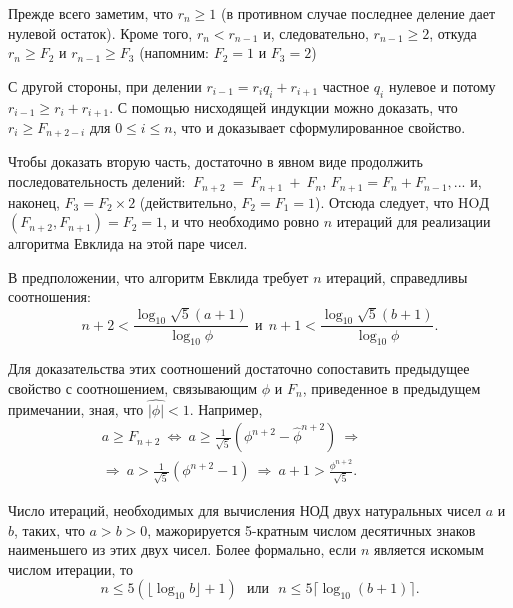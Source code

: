 \begin{myproof}
Прежде всего заметим, что $r_n \geqslant 1$ (в противном случае последнее 
деление дает нулевой остаток). Кроме того, $r_n < r_{n-1}$ и,  
следовательно, $r_{n-1} \geqslant 2$, откуда $r_n \geqslant F_2$ и $r_{n-1} \geqslant F_3$ (напомним: $F_2 = 1$ и 
$F_3 = 2$)

\noindent С другой стороны, при делении $r_{i-1} = r_i q_i + r_{i + 1}$  частное $q_i$ нулевое 
и потому $r_{i-1} \geqslant r_i + r_{i+1}$. С помощью нисходящей индукции можно 
доказать, что $r_i \geqslant F_{n+2-i}$ для $0 \leqslant i \leqslant n$, что и доказывает  
сформулированное свойство.
 
\noindent Чтобы доказать вторую часть, достаточно в явном виде  
продолжить последовательность делений: $\: F_{n+2}\: = \: F_{n+1}\: + \: F_n$, 
$F_{n+1} = F_n + F_{n-1}, ...$ и, наконец, $F_3 = F_2 \times 2$ (действительно, 
$F_2 = F_1 = 1$). Отсюда следует, что HOД$(F_{n+2}, F_{n+1}) = F_2 = 1$, и 
что необходимо ровно $n$ итераций для реализации алгоритма Евклида
 на этой паре чисел.
\end{myproof} 

\begin{property}
\hspace*{15pt}В предположении, что алгоритм Евклида требует $n$ итераций,  
справедливы соотношения: 
\begin{equation*}
n+2 < \frac{\log_{10}{\sqrt{5}(a+1)}}{\log_{10}{\phi}}\:\: \text{и} \:\: n+1 < \frac{\log_{10}{\sqrt{5}(b+1)}}{\log_{10}{\phi}}.
\end{equation*}
\end{property}

\begin{myproof}
Для доказательства этих соотношений достаточно сопоставить 
предыдущее свойство с соотношением, связывающим $\phi$ и $F_n$,  
приведенное в предыдущем примечании, зная, что $\hat{|\phi|} < 1$. Например, 
\begin{eqnarray*}
a \geqslant F_{n+2}\: \Leftrightarrow \: a \geqslant \frac{1}{\sqrt{5}}(\phi^{n+2} - \hat{\phi}^{n+2}) \: \Rightarrow \qquad\qquad \\
\Rightarrow \: a > \frac{1}{\sqrt{5}}(\phi^{n+2} - 1) \: \Rightarrow \: a+1 > \frac{\phi^{n+2}}{\sqrt{5}}.
\end{eqnarray*}
\end{myproof}

\begin{thm}[Ламе]
\hspace*{15pt}Число итераций, необходимых для вычисления $\text{НОД}$ двух  
натуральных чисел $a$ и $b$, таких, что $a > b > 0$, мажорируется 5-кратным числом 
десятичных знаков наименьшего из этих двух чисел. Более формально, 
если $n$ является искомым числом итерации, то
\begin{equation*}
n \leqslant 5(\lfloor \log_{10}{b} \rfloor + 1)\:\:\: \textit{или}\:\:\: n \leqslant 5 \lceil \log_{10}{(b+1)}\rceil.
\end{equation*}
\end{thm}

